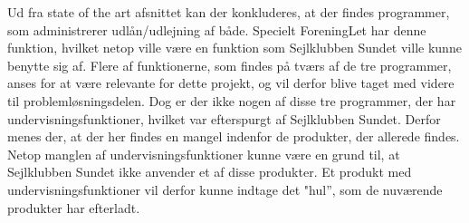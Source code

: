 Ud fra state of the art afsnittet kan der konkluderes, at der findes programmer, som administrerer udlån/udlejning af både.
Specielt ForeningLet har denne funktion, hvilket netop ville være en funktion som Sejlklubben Sundet ville kunne benytte sig af.
Flere af funktionerne, som findes på tværs af de tre programmer, anses for at være relevante for dette projekt, og vil derfor blive taget med videre til problemløsningsdelen.
Dog er der ikke nogen af disse tre programmer, der har undervisningsfunktioner, hvilket var efterspurgt af Sejlklubben Sundet. Derfor menes der, at der her findes en mangel indenfor de produkter, der allerede findes.
Netop manglen af undervisningsfunktioner kunne være en grund til, at Sejlklubben Sundet ikke anvender et af disse produkter.
Et produkt med undervisningsfunktioner vil derfor kunne indtage det "hul'', som de nuværende produkter har efterladt. 

